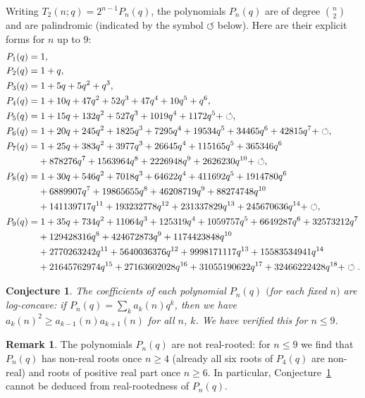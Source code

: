 \documentclass[pdftex]{sigma}
\numberwithin{equation}{section}
\newtheorem{Conjecture}[Theorem]{Conjecture}
\theoremstyle{definition}
\newtheorem{Remark}[Theorem]{Remark}
\begin{document}
Writing $T_2(n;q) = 2^{n-1} P_n(q)$, the polynomials $P_n(q)$ are of degree
$\binom{n}{2}$ and are palindromic (indicated by the symbol $\circlearrowleft$
below).
Here are their explicit forms for $n$ up to $9$:
\begin{align*}
&P_1(q)= 1, \\
&P_2(q)= 1+q, \\
&P_3(q)= 1+5q+5q^2+q^3, \\
&P_4(q)= 1+10q+47q^2+52q^3+47q^4+10q^5+q^6, \\
&P_5(q)= 1+15q+132q^2+527q^3+1019q^4+1172q^5+\circlearrowleft
	, \\
&P_6(q)= 1+20q+245q^2+1825q^3+7295q^4+19534q^5+34465q^6
	+42815q^7+\circlearrowleft, \\
&P_7(q)= 1+25q+383q^2+3977q^3+26645q^4+115165q^5+365346q^6 \\
&\hphantom{P_7(q)= }{}
+878276q^7+1563964q^8+2226948q^9+2626230q^{10}+\circlearrowleft, \\
&P_8(q)= 1+30q+546q^2+7018q^3+64622q^4+411692q^5+1914780q^6 \\
       &\hphantom{P_8(q)=}{}
        +6889907q^7+19865655q^8+46208719q^9+88274748q^{10} \\
       &\hphantom{P_8(q)=}{} +141139717q^{11}+193232778q^{12}+231337829q^{13}+245670636q^{14} +\circlearrowleft,\\
&P_9(q)=
	1 + 35q + 734q^2 + 11064q^3 + 125319q^4 + 1059757q^5 + 6649287q^6 + 32573212q^7\\
       &\hphantom{P_9(q)=}{}+ 129428316q^8 + 424672873q^9 + 1174423848q^{10} \\
        &
 \hphantom{P_9(q)=}{}
        + 2770263242q^{11} +
	5640036376q^{12}  + 9998171117q^{13} + 15583534941q^{14}
\\       &\hphantom{P_9(q)=}{}
	+21645762974q^{15}   + 27163602028q^{16} + 31055190622q^{17} +
	32466222428q^{18} + \circlearrowleft.
\end{align*}

\begin{Conjecture}
	\label{conj:log_concavity} The coefficients of each polynomial $P_n(q)$
	$($for each fixed $n)$ are
	log-concave: if $P_n(q) = \sum_{k} a_k(n) q^k$, then we have
	$a_k(n)^2 \ge a_{k-1}(n) a_{k+1}(n)$ for all $n$, $k$.
	We have verified this for $n \le 9$.
\end{Conjecture}

\begin{Remark}
	\label{rem:not_real_rooted}
	The polynomials $P_n(q)$ are not real-rooted: for $n\le9$ we find that
	$P_n(q)$ has non-real roots once $n\ge4$ (already all six roots of $P_4(q)$
	are non-real) and roots of positive real part once $n\ge6$.
	In particular, Conjecture~\ref{conj:log_concavity} cannot be deduced from
	real-rootedness of $P_n(q)$.
\end{Remark}
\end{document}
